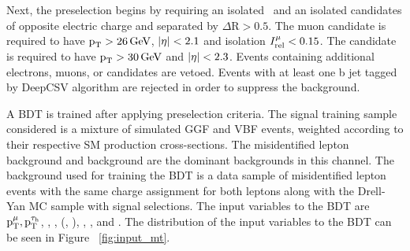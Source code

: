 Next, the preselection begins by requiring an isolated \Pgm\, and an isolated \tauh candidates of opposite electric charge and separated by $\Delta\text{R} > 0.5$. The muon candidate is required to have $\text{p}_\text{T} > 26\,\text{Ge\hspace{-.08em}V}$, $\lvert\eta\rvert < 2.1$ and isolation $I^{\mu}_\text{rel} < 0.15$. The \tauh candidate is required to have $\text{p}_\text{T} > 30\,\text{Ge\hspace{-.08em}V}$ and $\lvert\eta\rvert < 2.3$. Events containing additional electrons, muons, or \tauh candidates are vetoed. Events with at least one b jet tagged by DeepCSV algorithm are rejected in order to suppress the \ttbar background.

A BDT is trained after applying preselection criteria. The signal training sample considered is a mixture of simulated GGF and VBF events, weighted according to their respective SM production cross-sections. The misidentified lepton background and \Ztt background are the dominant backgrounds in this channel. The background used for training the BDT is a data sample of misidentified lepton events with the same charge assignment for both leptons along with the Drell-Yan MC sample with signal selections. The input variables to the BDT are $\text{p}_\text{T}^{\mu}, \text{p}_\text{T}^{\tau_{\text{h}}}$, \mcol, \ptvecmiss, \mt(\tauh, \ptvecmiss), \detamtauh, \dphimtauh, and \dphitauhmet. The distribution of the input variables to the BDT can be seen in Figure ~\ref{fig:input_mt}.

